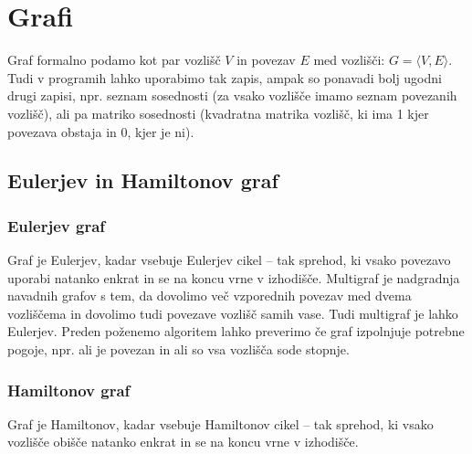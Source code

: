 \documentclass[10pt,a4paper,oneside]{book}
\begin{document}
\chapter{Grafi}
Graf formalno podamo kot par vozlišč $V$ in povezav $E$ med vozlišči: $G=\langle V, E \rangle$. Tudi v programih lahko uporabimo tak zapis, ampak so ponavadi bolj ugodni drugi zapisi, npr. seznam sosednosti (za vsako vozlišče imamo seznam povezanih vozlišč), ali pa matriko sosednosti (kvadratna matrika vozlišč, ki ima 1 kjer povezava obstaja in 0, kjer je ni).

\section{Eulerjev in Hamiltonov graf}
\subsection{Eulerjev graf}
Graf je Eulerjev, kadar vsebuje Eulerjev cikel -- tak sprehod, ki vsako povezavo uporabi natanko enkrat in se na koncu vrne v izhodišče. Multigraf je nadgradnja navadnih grafov s tem, da dovolimo več vzporednih povezav med dvema vozliščema in dovolimo tudi povezave vozlišč samih vase. Tudi multigraf je lahko Eulerjev. Preden poženemo algoritem lahko preverimo če graf izpolnjuje potrebne pogoje, npr. ali je povezan in ali so vsa vozlišča sode stopnje.

\subsection{Hamiltonov graf}
Graf je Hamiltonov, kadar vsebuje Hamiltonov cikel -- tak sprehod, ki vsako vozlišče obišče natanko enkrat in se na koncu vrne v izhodišče.
\end{document}
